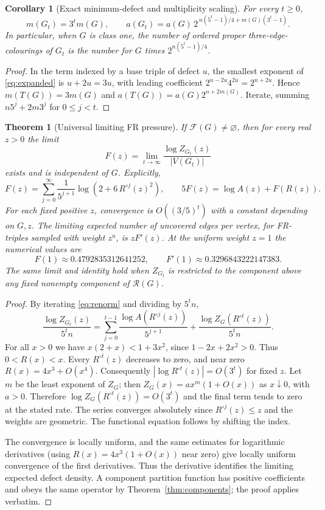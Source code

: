 \documentclass[11pt]{article}
\newtheorem{theorem}{Theorem}
\newtheorem{corollary}{Corollary}
\newcommand{\FR}{\mathcal{F}}
\newcommand{\Rconf}{\mathcal{R}}
\begin{document}
\begin{corollary}[Exact minimum-defect and multiplicity scaling]\label{cor:min}
For every $t\ge0$,
\[
 \boxed{m(G_t)=3^t m(G),\qquad
 a(G_t)=a(G)\,2^{\,n(5^t-1)/4+m(G)(3^t-1)}.}
\]
In particular, when $G$ is class one, the number of ordered proper three-edge-colourings of $G_t$ is the number for $G$ times $2^{n(5^t-1)/4}$.
\end{corollary}
\begin{proof}
In the term indexed by a base triple of defect $u$, the smallest exponent of \eqref{eq:expanded} is $u+2u=3u$, with leading coefficient $2^{n-2u}4^{2u}=2^{n+2u}$. Hence $m(T(G))=3m(G)$ and $a(T(G))=a(G)2^{n+2m(G)}$. Iterate, summing $n5^j+2m3^j$ for $0\le j<t$.
\end{proof}

\begin{theorem}[Universal limiting FR pressure]\label{thm:pressure}
If $\FR(G)\ne\varnothing$, then for every real $z>0$ the limit
\[
 F(z)=\lim_{t\to\infty}\frac{\log Z_{G_t}(z)}{|V(G_t)|}
\]
exists and is independent of $G$. Explicitly,
\begin{equation}\label{eq:pressure}
\boxed{F(z)=\sum_{j=0}^{\infty}\frac{1}{5^{j+1}}
 \log\!\left(2+6\,R^{\circ j}(z)^2\right),}\qquad
 5F(z)=\log A(z)+F(R(z)).
\end{equation}
For each fixed positive $z$, convergence is $O((3/5)^t)$ with a constant depending on $G,z$. The limiting expected number of uncovered edges \emph{per vertex}, for FR-triples sampled with weight $z^{u}$, is $zF'(z)$. At the uniform weight $z=1$ the numerical values are
\[
 F(1)\approx0.4792835312641252,
 \qquad F'(1)\approx0.3296843222147383.
\]
The same limit and identity hold when $Z_{G_t}$ is restricted to the component above any fixed nonempty component of $\Rconf(G)$.
\end{theorem}
\begin{proof}
By iterating \eqref{eq:renorm} and dividing by $5^tn$,
\[
 \frac{\log Z_{G_t}(z)}{5^tn}
 =\sum_{j=0}^{t-1}\frac{\log A(R^{\circ j}(z))}{5^{j+1}}
  +\frac{\log Z_G(R^{\circ t}(z))}{5^tn}.
\]
For all $x>0$ we have $x(2+x)<1+3x^2$, since $1-2x+2x^2>0$. Thus $0<R(x)<x$. Every $R^{\circ t}(z)$ decreases to zero, and near zero $R(x)=4x^3+O(x^4)$. Consequently $|\log R^{\circ t}(z)|=O(3^t)$ for fixed $z$. Let $m$ be the least exponent of $Z_G$; then $Z_G(x)=a x^m(1+O(x))$ as $x\downarrow0$, with $a>0$. Therefore $\log Z_G(R^{\circ t}(z))=O(3^t)$ and the final term tends to zero at the stated rate. The series converges absolutely since $R^{\circ j}(z)\le z$ and the weights are geometric. The functional equation follows by shifting the index.

The convergence is locally uniform, and the same estimates for logarithmic derivatives (using $R(x)=4x^3(1+O(x))$ near zero) give locally uniform convergence of the first derivatives. Thus the derivative identifies the limiting expected defect density. A component partition function has positive coefficients and obeys the same operator by Theorem~\ref{thm:components}; the proof applies verbatim.
\end{proof}
\end{document}
